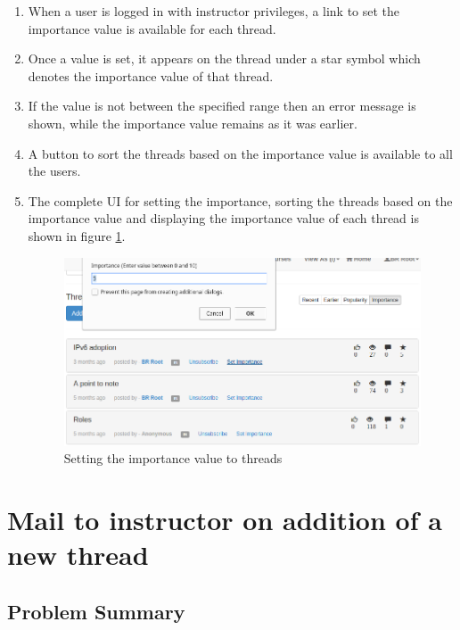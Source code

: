\begin{enumerate}
	\item When a user is logged in with instructor privileges, a link to set the importance value is available for each thread.
	\item Once a value is set, it appears on the thread under a star symbol which denotes the importance value of that thread.
	\item If the value is not between the specified range then an error message is shown, while the importance value remains as it was earlier.
	\item A button to sort the threads based on the importance value is available to all the users.
	\item The complete UI for setting the importance, sorting the threads based on the importance value and displaying the importance value of each thread is shown in figure \ref{fig:set-importance}.
	
	\newpage
	
	\begin{figure}[h]
		\centering
		\includegraphics[width=0.95\linewidth]{./media/set_importance}
		\caption{Setting the importance value to threads}
		\label{fig:set-importance}
	\end{figure}
		
\end{enumerate}

\newpage

\section{Mail to instructor on addition of a new thread}

\subsection*{Problem Summary}

